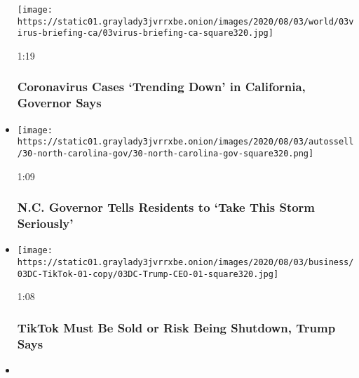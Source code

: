\begin{itemize}
  \texttt{[image: https://static01.graylady3jvrrxbe.onion/images/2020/08/03/world/03virus-briefing-ca/03virus-briefing-ca-square320.jpg]}

  1:19

  \hypertarget{coronavirus-cases-trending-down-in-california-governor-says}{%
  \subsubsection{Coronavirus Cases `Trending Down' in California,
  Governor
  Says}\label{coronavirus-cases-trending-down-in-california-governor-says}}
\item
  \href{https://www.nytimes3xbfgragh.onion/video/us/100000007271090/north-carolina-isaias-coronavirus.html?action=click\&module=video-series-bar\&region=header\&pgtype=Article\&playlistId=video/u-s}{}

  \texttt{[image: https://static01.graylady3jvrrxbe.onion/images/2020/08/03/autossell/30-north-carolina-gov/30-north-carolina-gov-square320.png]}

  1:09

  \hypertarget{nc-governor-tells-residents-to-take-this-storm-seriously}{%
  \subsubsection{N.C. Governor Tells Residents to `Take This Storm
  Seriously'}\label{nc-governor-tells-residents-to-take-this-storm-seriously}}
\item
  \href{https://www.nytimes3xbfgragh.onion/video/us/100000007270771/trump-tiktok-shutdown-microsoft.html?action=click\&module=video-series-bar\&region=header\&pgtype=Article\&playlistId=video/u-s}{}

  \texttt{[image: https://static01.graylady3jvrrxbe.onion/images/2020/08/03/business/03DC-TikTok-01-copy/03DC-Trump-CEO-01-square320.jpg]}

  1:08

  \hypertarget{tiktok-must-be-sold-or-risk-being-shutdown-trump-says}{%
  \subsubsection{TikTok Must Be Sold or Risk Being Shutdown, Trump
  Says}\label{tiktok-must-be-sold-or-risk-being-shutdown-trump-says}}
\item
  \href{https://www.nytimes3xbfgragh.onion/video/us/100000007269993/judge-salas-new-jersey.html?action=click\&module=video-series-bar\&region=header\&pgtype=Article\&playlistId=video/u-s}{}


\end{itemize}
